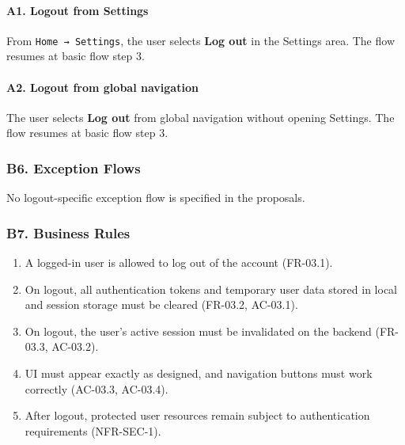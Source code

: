 \documentclass[12pt]{article}
\begin{document}
\paragraph*{A1. Logout from Settings}
\par\medskip

From \texttt{Home → Settings}, the user selects \textbf{Log out} in the Settings area. The flow resumes at basic flow step 3.
\par\medskip

\hypertarget{sec:a2-logout-from-global-navigation}{}
\paragraph*{A2. Logout from global navigation}
\par\medskip

The user selects \textbf{Log out} from global navigation without opening Settings. The flow resumes at basic flow step 3.
\par\medskip

\hypertarget{sec:b6-exception-flows}{}
\subsubsection*{B6. Exception Flows}
\par\medskip

No logout-specific exception flow is specified in the proposals.
\par\medskip

\hypertarget{sec:b7-business-rules}{}
\subsubsection*{B7. Business Rules}
\par\medskip

\begin{enumerate}
\item A logged-in user is allowed to log out of the account (FR-03.1).
\item On logout, all authentication tokens and temporary user data stored in local and session storage must be cleared (FR-03.2, AC-03.1).
\item On logout, the user's active session must be invalidated on the backend (FR-03.3, AC-03.2).
\item UI must appear exactly as designed, and navigation buttons must work correctly (AC-03.3, AC-03.4).
\item After logout, protected user resources remain subject to authentication requirements (NFR-SEC-1).
\end{enumerate}
\par\medskip
\end{document}
